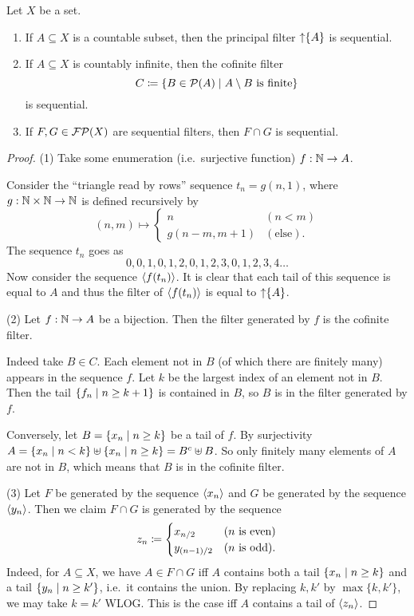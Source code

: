 \begin{proposition} \label{sequenceConstructionsSequentialFilters}
Let $X$ be a set.
\begin{enumerate}
\item If $A\subseteq X$ is a countable subset, then the principal filter $\operatorname{\uparrow}\{A\}$ is sequential.
\item If $A\subseteq X$ is countably infinite, then the cofinite filter
\[ C \defeq \setbuilder{B\in\powerset(A)}{\text{$A\setminus B$ is finite}} \]
is sequential.
\item If $F,G\in\operatorname{\mathcal{FP}}(X)$ are sequential filters, then $F\cap G$ is sequential.
\end{enumerate}
\end{proposition}
\begin{proof}
(1) Take some enumeration (i.e.\ surjective function) $f:\mathbb{N}\to A$.

Consider the ``triangle read by rows'' sequence $t_n = g(n,1)$, where $g: \mathbb{N}\times\mathbb{N}\to \mathbb{N}$ is defined recursively by
\[ (n,m) \mapsto \begin{cases}
n & (n < m) \\
g(n-m, m+1) & (\text{else}).
\end{cases} \]
The sequence $t_n$ goes as
\[ 0,0,1,0,1,2,0,1,2,3,0,1,2,3,4 \ldots \]
Now consider the sequence $\left\langle f(t_n) \right\rangle$. It is clear that each tail of this sequence is equal to $A$ and thus the filter of $\left\langle f(t_n) \right\rangle$ is equal to $\operatorname{\uparrow}\{A\}$.

(2) Let $f: \mathbb{N}\to A$ be a bijection. Then the filter generated by $f$ is the cofinite filter.

Indeed take $B\in C$. Each element not in $B$ (of which there are finitely many) appears in the sequence $f$. Let $k$ be the largest index of an element not in $B$. Then the tail $\setbuilder{f_n}{n\geq k+1}$ is contained in $B$, so $B$ is in the filter generated by $f$.

Conversely, let $B = \setbuilder{x_n}{n\geq k}$ be a tail of $f$. By surjectivity $A = \setbuilder{x_n}{n<k}\uplus \setbuilder{x_n}{n\geq k} = B^c \uplus B$. So only finitely many elements of $A$ are not in $B$, which means that $B$ is in the cofinite filter.

(3) Let $F$ be generated by the sequence $\left\langle x_n \right\rangle$ and $G$ be generated by the sequence $\left\langle y_n \right\rangle$. Then we claim $F\cap G$ is generated by the sequence
\[ z_n \coloneqq \begin{cases}
x_{n/2} & (\text{$n$ is even}) \\
y_{(n-1)/2} & (\text{$n$ is odd}).
\end{cases} \]
Indeed, for $A\subseteq X$, we have $A\in F\cap G$ iff $A$ contains both a tail $\setbuilder{x_n}{n\geq k}$ and a tail $\setbuilder{y_n}{n\geq k'}$, i.e.\ it contains the union. By replacing $k,k'$ by $\max\{k,k'\}$, we may take $k=k'$ WLOG. This is the case iff $A$ contains a tail of $\left\langle z_n \right\rangle$.
\end{proof}

